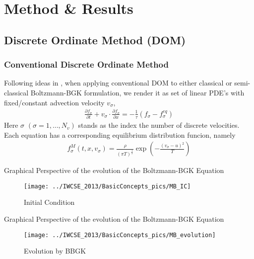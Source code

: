 \section{Method \& Results}

\subsection{Discrete Ordinate Method (DOM)}
\begin{frame} \frametitle{Conventional Discrete Ordinate Method}
	Following ideas in \cite{Yang1995323}, when applying conventional DOM to either classical or semi-classical Boltzmann-BGK formulation, we render it as set of linear PDE's with fixed/constant advection velocity $v_\sigma$,
	\begin{align}
	\frac{\partial{f_\sigma}}{\partial{t}} +
	v_\sigma\cdot\frac{\partial{f_\sigma}}{\partial x} = 
	-\frac{1}{\tau}(f_\sigma-f^{eq}_\sigma)
	\end{align}
Here $\sigma$ $(\sigma = 1,\dots,N_v)$ stands as the index the number of discrete velocities. Each equation has a corresponding equilibrium distribution funcion, namely
	\begin{align}
	f_\sigma^{M}(t,x,v_\sigma)= \frac{\rho}{(\pi T)^{\frac{1}{2}}} \exp\left({-\frac{(v_\sigma-u)^2}{T}} \right)
	\end{align}
\end{frame}

\begin{frame}
Graphical Perspective of the evolution of the Boltzmann-BGK Equation
\begin{figure}
	\centering
	\texttt{[image: ../IWCSE\_2013/BasicConcepts\_pics/MB\_IC]}
	\caption{Initial Condition}
	\label{fig:f_IC}
\end{figure}
\end{frame}

\begin{frame}
Graphical Perspective of the evolution of the Boltzmann-BGK Equation
\begin{figure}
	\centering
	\texttt{[image: ../IWCSE\_2013/BasicConcepts\_pics/MB\_evolution]}
	\caption{Evolution by BBGK}
	\label{fig:f_evolution}
\end{figure}
\end{frame}

